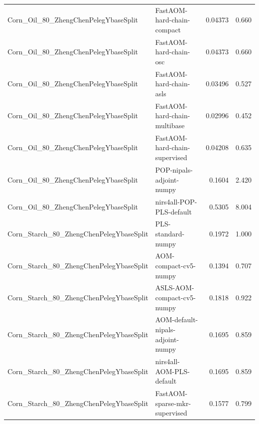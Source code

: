 \begin{landscape}
\begin{longtable}{L{8.0cm}L{9.5cm}rr}
Corn\_\allowbreak{}Oil\_\allowbreak{}80\_\allowbreak{}ZhengChenPelegYbaseSplit & FastAOM-\allowbreak{}hard-\allowbreak{}chain-\allowbreak{}compact & 0.04373 & 0.660 \\
Corn\_\allowbreak{}Oil\_\allowbreak{}80\_\allowbreak{}ZhengChenPelegYbaseSplit & FastAOM-\allowbreak{}hard-\allowbreak{}chain-\allowbreak{}osc & 0.04373 & 0.660 \\
Corn\_\allowbreak{}Oil\_\allowbreak{}80\_\allowbreak{}ZhengChenPelegYbaseSplit & FastAOM-\allowbreak{}hard-\allowbreak{}chain-\allowbreak{}asls & 0.03496 & 0.527 \\
Corn\_\allowbreak{}Oil\_\allowbreak{}80\_\allowbreak{}ZhengChenPelegYbaseSplit & FastAOM-\allowbreak{}hard-\allowbreak{}chain-\allowbreak{}multibase & 0.02996 & 0.452 \\
Corn\_\allowbreak{}Oil\_\allowbreak{}80\_\allowbreak{}ZhengChenPelegYbaseSplit & FastAOM-\allowbreak{}hard-\allowbreak{}chain-\allowbreak{}supervised & 0.04208 & 0.635 \\
Corn\_\allowbreak{}Oil\_\allowbreak{}80\_\allowbreak{}ZhengChenPelegYbaseSplit & POP-\allowbreak{}nipals-\allowbreak{}adjoint-\allowbreak{}numpy & 0.1604 & 2.420 \\
Corn\_\allowbreak{}Oil\_\allowbreak{}80\_\allowbreak{}ZhengChenPelegYbaseSplit & nirs4all-\allowbreak{}POP-\allowbreak{}PLS-\allowbreak{}default & 0.5305 & 8.004 \\
Corn\_\allowbreak{}Starch\_\allowbreak{}80\_\allowbreak{}ZhengChenPelegYbaseSplit & PLS-\allowbreak{}standard-\allowbreak{}numpy & 0.1972 & 1.000 \\
Corn\_\allowbreak{}Starch\_\allowbreak{}80\_\allowbreak{}ZhengChenPelegYbaseSplit & AOM-\allowbreak{}compact-\allowbreak{}cv5-\allowbreak{}numpy & 0.1394 & 0.707 \\
Corn\_\allowbreak{}Starch\_\allowbreak{}80\_\allowbreak{}ZhengChenPelegYbaseSplit & ASLS-\allowbreak{}AOM-\allowbreak{}compact-\allowbreak{}cv5-\allowbreak{}numpy & 0.1818 & 0.922 \\
Corn\_\allowbreak{}Starch\_\allowbreak{}80\_\allowbreak{}ZhengChenPelegYbaseSplit & AOM-\allowbreak{}default-\allowbreak{}nipals-\allowbreak{}adjoint-\allowbreak{}numpy & 0.1695 & 0.859 \\
Corn\_\allowbreak{}Starch\_\allowbreak{}80\_\allowbreak{}ZhengChenPelegYbaseSplit & nirs4all-\allowbreak{}AOM-\allowbreak{}PLS-\allowbreak{}default & 0.1695 & 0.859 \\
Corn\_\allowbreak{}Starch\_\allowbreak{}80\_\allowbreak{}ZhengChenPelegYbaseSplit & FastAOM-\allowbreak{}sparse-\allowbreak{}mkr-\allowbreak{}supervised & 0.1577 & 0.799 \\

\end{longtable}
\end{landscape}
